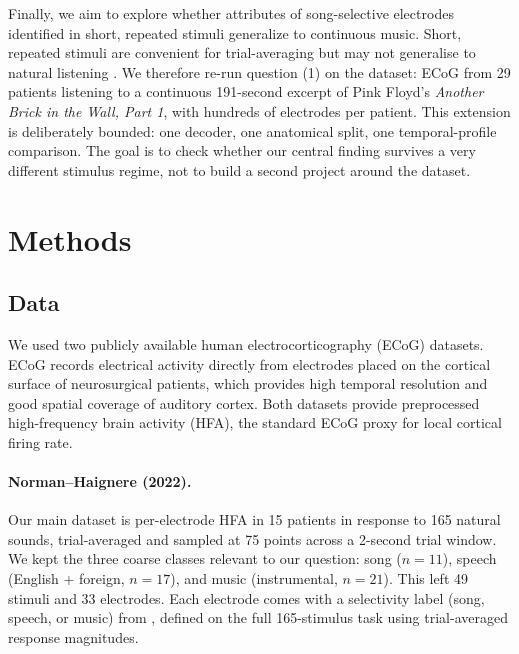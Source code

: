 \documentclass[11pt]{article}
\begin{document}
Finally, we aim to explore whether 
attributes of song-selective electrodes identified in short, repeated stimuli generalize to continuous music. Short, repeated stimuli are convenient for trial-averaging but may not generalise to natural listening \citep{HamiltonHuth2020}. We therefore re-run question (1) on the \citet{Bellier2023} dataset: ECoG from 29 patients listening to a continuous 191-second excerpt of Pink Floyd's \emph{Another Brick in the Wall, Part 1}, with hundreds of electrodes per patient. This extension is deliberately bounded: one decoder, one anatomical split, one temporal-profile comparison. The goal is to check whether our central finding survives a very different stimulus regime, not to build a second project around the dataset.

\section{Methods}\label{sec:methods}

\subsection{Data}
We used two publicly available human electrocorticography (ECoG) datasets. ECoG records electrical activity directly from electrodes placed on the cortical surface of neurosurgical patients, which provides high temporal resolution and good spatial coverage of auditory cortex. Both datasets provide preprocessed high-frequency brain activity (HFA), the standard ECoG proxy for local cortical firing rate.

\paragraph{Norman--Haignere (2022).} Our main dataset is per-electrode HFA in 15 patients in response to 165 natural sounds, trial-averaged and sampled at 75 points across a 2-second trial window. We kept the three coarse classes relevant to our question: \textsf{song} ($n = 11$), \textsf{speech} (English + foreign, $n = 17$), and \textsf{music} (instrumental, $n = 21$). This left 49 stimuli and 33 electrodes. Each electrode comes with a selectivity label (song, speech, or music) from \citet{NormanHaignere2022}, defined on the full 165-stimulus task using trial-averaged response magnitudes.
\end{document}
